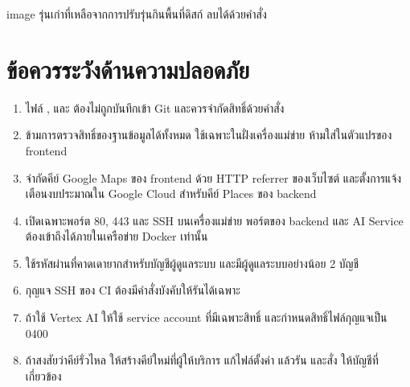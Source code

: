 \begin{tip}
image รุ่นเก่าที่เหลือจากการปรับรุ่นกินพื้นที่ดิสก์ ลบได้ด้วยคำสั่ง 
\end{tip}

\section{ข้อควรระวังด้านความปลอดภัย}

\begin{enumerate}
\item ไฟล์ ,  และ  ต้องไม่ถูกบันทึกเข้า Git และควรจำกัดสิทธิ์ด้วยคำสั่ง 
\item {} ข้ามการตรวจสิทธิ์ของฐานข้อมูลได้ทั้งหมด ใช้เฉพาะในฝั่งเครื่องแม่ข่าย ห้ามใส่ในตัวแปรของ frontend
\item จำกัดคีย์ Google Maps ของ frontend ด้วย HTTP referrer ของเว็บไซต์ และตั้งการแจ้งเตือนงบประมาณใน Google Cloud สำหรับคีย์ Places ของ backend
\item เปิดเฉพาะพอร์ต 80, 443 และ SSH บนเครื่องแม่ข่าย พอร์ตของ backend และ AI Service ต้องเข้าถึงได้ภายในเครือข่าย Docker เท่านั้น
\item ใช้รหัสผ่านที่คาดเดายากสำหรับบัญชีผู้ดูแลระบบ และมีผู้ดูแลระบบอย่างน้อย 2 บัญชี
\item กุญแจ SSH ของ CI ต้องมีคำสั่งบังคับให้รันได้เฉพาะ 
\item ถ้าใช้ Vertex AI ให้ใช้ service account ที่มีเฉพาะสิทธิ์  และกำหนดสิทธิ์ไฟล์กุญแจเป็น 0400
\item ถ้าสงสัยว่าคีย์รั่วไหล ให้สร้างคีย์ใหม่ที่ผู้ให้บริการ แก้ไฟล์ตั้งค่า แล้วรัน  และสั่ง  ให้บัญชีที่เกี่ยวข้อง
\end{enumerate}
